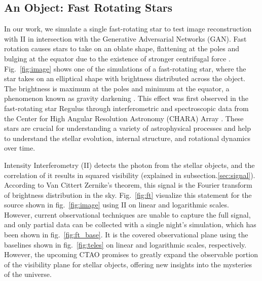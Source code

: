 \subsection{An Object: Fast Rotating Stars}
In our work, we simulate a single fast-rotating star to test image reconstruction with II in intersection with the Generative Adversarial Networks (GAN). Fast rotation causes stars to take on an oblate shape, flattening at the poles and bulging at the equator due to the existence of stronger centrifugal force \citep{von1924radiative, 1999A&A...347..185M}. Fig.~\ref{fig:image} shows one of the simulations of a fast-rotating star, where the star takes on an elliptical shape with brightness distributed across the object. The brightness is maximum at the poles and minimum at the equator, a phenomenon known as gravity darkening \citep{lucy1967gravity}. This effect was first observed in the fast-rotating star Regulus through interferometric and spectroscopic data from the Center for High Angular Resolution Astronomy (CHARA) Array \citep{mcalister2005first}. These stars are crucial for understanding a variety of astrophysical processes and help to understand the stellar evolution, internal structure, and rotational dynamics over time.

Intensity Interferometry (II) detects the photon from the stellar objects, and the correlation of it results in squared visibility (explained in subsection.\ref{sec:signal}). According to Van Cittert Zernike's theorem, this signal is the Fourier transform of brightness distribution in the sky. Fig.~\ref {fig:ft} visualize this statement for the source shown in fig.~\ref{fig:image} using II on linear and logarithmic scales. However, current observational techniques are unable to capture the full signal, and only partial data can be collected with a single night's simulation, which has been shown in fig.~\ref{fig:ft_base}. It is the covered observational plane using the baselines shown in fig.~\ref{fig:teles} on linear and logarithmic scales, respectively. However, the upcoming CTAO promises to greatly expand the observable portion of the visibility plane for stellar objects, offering new insights into the mysteries of the universe.